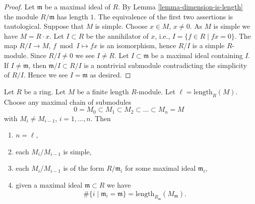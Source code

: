 \begin{proof}
Let $\mathfrak m$ be a maximal ideal of $R$.
By Lemma \ref{lemma-dimension-is-length} the module
$R/\mathfrak m$ has length $1$. The equivalence of
the first two assertions is tautological. 
Suppose that $M$ is simple. Choose $x \in M$, $x \not = 0$.
As $M$ is simple we have $M = R \cdot x$. 
Let $I \subset R$ be the annihilator of $x$, i.e.,
$I = \{f \in R \mid fx = 0\}$. The map $R/I \to M$,
$f \bmod I \mapsto fx$ is an isomorphism, hence
$R/I$ is a simple $R$-module. Since $R/I \not = 0$ we see $I \not = R$.
Let $I \subset \mathfrak m$ be a maximal ideal containing $I$.
If $I \not = \mathfrak m$, then $\mathfrak m /I \subset R/I$
is a nontrivial submodule contradicting the simplicity
of $R/I$. Hence we see $I = \mathfrak m$ as desired.
\end{proof}

\begin{lemma}
\label{lemma-simple-pieces}
Let $R$ be a ring. Let $M$ be a finite length $R$-module.
Let $\ell = \text{length}_R(M)$. Choose any maximal chain of
submodules
$$
0 = M_0 \subset M_1 \subset M_2 \subset \ldots \subset M_n = M
$$
with $M_i \not = M_{i-1}$, $i=1,\ldots,n$. Then
\begin{enumerate}
\item $n = \ell$,
\item each $M_i/M_{i-1}$ is simple,
\item each $M_i/M_{i-1}$ is of the form
$R/\mathfrak m_i$ for some maximal ideal $\mathfrak m_i$,
\item given a maximal ideal $\mathfrak m \subset R$
we have
$$
\# \{i \mid \mathfrak m_i = \mathfrak m\}
=
\text{length}_{R_{\mathfrak m}} (M_{\mathfrak m}).
$$
\end{enumerate}
\end{lemma}

